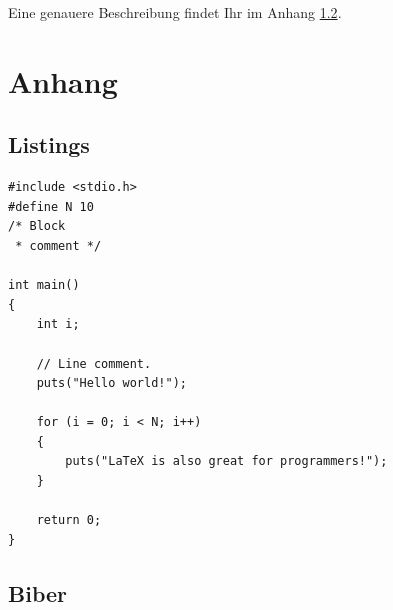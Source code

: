 \documentclass[12pt,DIV=15,BCOR=15mm,twoside,headsepline,abstract=true,listof=totoc,bibliography=totoc]{scrreprt}
\theoremstyle{remark}	%
\begin{document}
Eine genauere Beschreibung findet Ihr im Anhang \ref{sec:biber}.
\appendix

\printbibliography %


\eigenstaenigkeitserklaerung

\cleardoublepage

\chapter{Anhang}
\section{Listings}

\lstset{language=C}
 \begin{lstlisting}[caption=C Code - direkt eingefügt, label=list:C]
#include <stdio.h>
#define N 10
/* Block
 * comment */

int main()
{
    int i;

    // Line comment.
    puts("Hello world!");
    
    for (i = 0; i < N; i++)
    {
        puts("LaTeX is also great for programmers!");
    }

    return 0;
}
\end{lstlisting}




\lstset{language=Java}



% 

\section{Biber}
\label{sec:biber}

\end{document}

